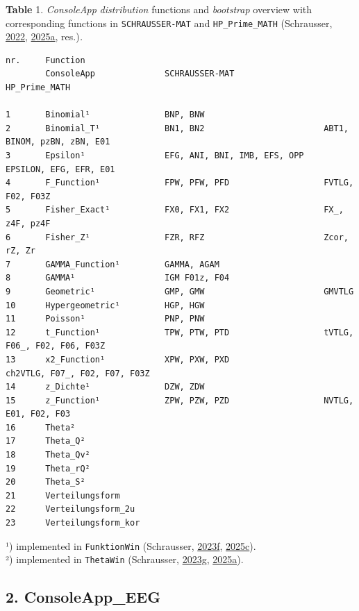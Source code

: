 \documentclass[
]{article}
\begin{document}
\textbf{Table} 1. \emph{ConsoleApp} \emph{distribution} functions and
\emph{bootstrap} overview with corresponding functions in
\texttt{SCHRAUSSER-MAT} and \texttt{HP\_Prime\_MATH} (Schrausser,
\href{https://doi.org/10.17605/OSF.IO/8XE42}{2022},
\href{https://doi.org/10.5281/zenodo.15713317}{2025a}, res.)\emph{.}

\begin{verbatim}
nr.     Function        
        ConsoleApp              SCHRAUSSER-MAT                  HP_Prime_MATH

1       Binomial¹               BNP, BNW    
2       Binomial_T¹             BN1, BN2                        ABT1, BINOM, pzBN, zBN, E01
3       Epsilon¹                EFG, ANI, BNI, IMB, EFS, OPP    EPSILON, EFG, EFR, E01
4       F_Function¹             FPW, PFW, PFD                   FVTLG, F02, F03Z
5       Fisher_Exact¹           FX0, FX1, FX2                   FX_, z4F, pz4F
6       Fisher_Z¹               FZR, RFZ                        Zcor, rZ, Zr
7       GAMMA_Function¹         GAMMA, AGAM 
8       GAMMA¹                  IGM F01z, F04
9       Geometric¹              GMP, GMW                        GMVTLG
10      Hypergeometric¹         HGP, HGW    
11      Poisson¹                PNP, PNW    
12      t_Function¹             TPW, PTW, PTD                   tVTLG, F06_, F02, F06, F03Z
13      x2_Function¹            XPW, PXW, PXD                   ch2VTLG, F07_, F02, F07, F03Z
14      z_Dichte¹               DZW, ZDW    
15      z_Function¹             ZPW, PZW, PZD                   NVTLG, E01, F02, F03
16      Theta²      
17      Theta_Q²        
18      Theta_Qv²       
19      Theta_rQ²       
20      Theta_S²        
21      Verteilungsform     
22      Verteilungsform_2u      
23      Verteilungsform_kor
\end{verbatim}

¹) implemented in \texttt{FunktionWin} (Schrausser,
\href{https://doi.org/10.5281/zenodo.7651661}{2023f},
\href{https://doi.org/10.5281/zenodo.17880113}{2025c}).\\
²) implemented in \texttt{ThetaWin} (Schrausser,
\href{https://doi.org/10.5281/zenodo.7659264}{2023g},
\href{https://doi.org/10.5281/zenodo.17880113}{2025a}).

\hypertarget{consoleapp_eeg}{%
\subsection{2. ConsoleApp\_EEG}\label{consoleapp_eeg}}
\end{document}
